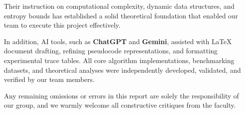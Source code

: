 \documentclass{article}
\begin{document}
Their instruction on computational complexity, dynamic data structures, and entropy bounds has established a solid theoretical foundation that enabled our team to execute this project effectively. 

In addition, AI tools, such as \textbf{ChatGPT} and \textbf{Gemini}, assisted with LaTeX document drafting, refining pseudocode representations, and formatting experimental trace tables. All core algorithm implementations, benchmarking datasets, and theoretical analyses were independently developed, validated, and verified by our team members.

Any remaining omissions or errors in this report are solely the responsibility of our group, and we warmly welcome all constructive critiques from the faculty.
\end{document}
